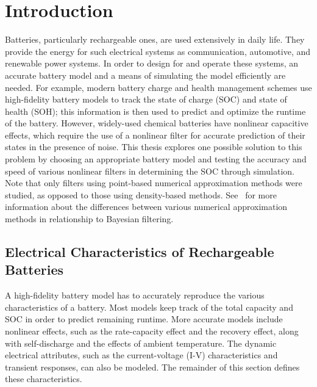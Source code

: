 \documentclass[../zhang_thesis.tex]{subfiles}
\begin{document}
\chapter{Introduction}

Batteries, particularly rechargeable ones, are used extensively in daily life. They provide the energy for such electrical systems as communication, automotive, and renewable power systems. In order to design for and operate these systems, an accurate battery model and a means of simulating the model efficiently are needed. For example, modern battery charge and health management schemes use high-fidelity battery models to track the state of charge (SOC) and state of health (SOH); this
information is then used to predict and optimize the runtime of the battery. However, widely-used chemical batteries have nonlinear capacitive effects, which require the use of a nonlinear filter for accurate prediction of their states in the presence of noise. This thesis explores one possible solution to this problem by choosing an appropriate battery model and testing the accuracy and speed of various nonlinear filters in determining the SOC through simulation. Note that only filters
using point-based numerical approximation methods were studied, as opposed to those using density-based methods. See~\cite{chen03} for more information about the differences between various numerical approximation methods in relationship to Bayesian filtering.


\section{Electrical Characteristics of Rechargeable Batteries}
\label{sec:echar}

A high-fidelity battery model has to accurately reproduce the various characteristics of a battery. Most models keep track of the total capacity and SOC in order to predict remaining runtime. More accurate models include nonlinear effects, such as the rate-capacity effect and the recovery effect, along with self-discharge and the effects of ambient temperature. The dynamic electrical attributes, such as the current-voltage (I-V) characteristics and transient responses, can also be
modeled. The remainder of this section defines these characteristics.
\end{document}
